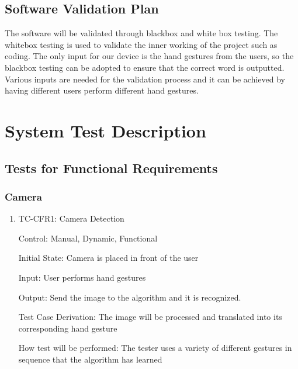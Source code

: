 \documentclass[12pt]{article}
\begin{document}
\subsection{Software Validation Plan}

The software will be validated through blackbox and white box  testing. The whitebox testing is used to validate the inner working of the project such as coding. The only input for our device is the hand gestures from the users, so the blackbox testing can be adopted to ensure that the correct word is outputted. Various inputs are needed for the validation process and it can be achieved by having different users perform different hand gestures.

\section{System Test Description}
	
\subsection{Tests for Functional Requirements}


\subsubsection{Camera}
		
  
\begin{enumerate}
  
\item{TC-CFR1: Camera Detection\\}
  
Control: Manual, Dynamic, Functional
            
Initial State: Camera is placed in front of the user
            
Input: User performs hand gestures
            
Output: Send the image to the algorithm and it is recognized.
  
Test Case Derivation: The image will be processed and translated into its corresponding hand gesture
            
How test will be performed: The tester uses a variety of different gestures in sequence that the algorithm has learned
  
\end{enumerate}
  
\end{document}

